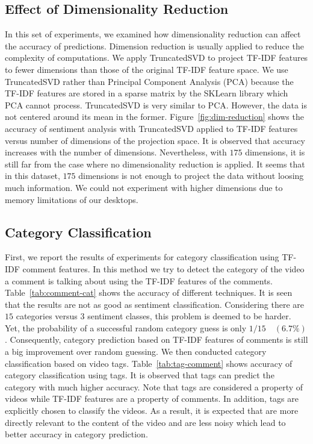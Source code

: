 \subsection{Effect of Dimensionality Reduction}
\label{sec:dim-reduction}
In this set of experiments, we examined how dimensionality reduction can affect the accuracy of predictions. Dimension reduction is usually applied to reduce the complexity of computations. We apply TruncatedSVD to project TF-IDF features to fewer dimensions than those of the original TF-IDF feature space. We use TruncatedSVD rather than Principal Component Analysis (PCA) because the TF-IDF features are stored in a sparse matrix by the SKLearn library which PCA cannot process. TruncatedSVD is very similar to PCA. However, the data is not centered around its mean in the former.
Figure~\ref{fig:dim-reduction} shows the accuracy of sentiment analysis with TruncatedSVD applied to TF-IDF features versus number of dimensions of the projection space. It is observed that accuracy increases with the number of dimensions. Nevertheless, with $175$ dimensions, it is still far from the case where no dimensionality reduction is applied. It seems that in this dataset, $175$ dimensions is not enough to project the data without loosing much information. We could not experiment with higher dimensions due to memory limitations of our desktops.

\subsection{Category Classification}
\label{sec:cat-exp}

First, we report the results of experiments for category classification using TF-IDF comment features. In this method we try to detect the category of the video a comment is talking about using the TF-IDF features of the comments. Table~\ref{tab:comment-cat} shows the accuracy of different techniques. It is seen that the results are not as good as sentiment classification. Considering there are $15$ categories versus $3$ sentiment classes, this problem is deemed to be harder. Yet, the probability of a successful random category guess is only $1/15 \quad (6.7\%)$. Consequently, category prediction based on TF-IDF features of comments is still a big improvement over random guessing.
We then conducted category classification based on video tags. Table~\ref{tab:tag-comment} shows accuracy of category classification using tags. It is observed that tags can predict the category with much higher accuracy. Note that tags are considered a property of videos while TF-IDF features are a property of comments. In addition, tags are explicitly chosen to classify the videos. As a result, it is expected that are more directly relevant to the content of the video and are less noisy which lead to better accuracy in category prediction.

